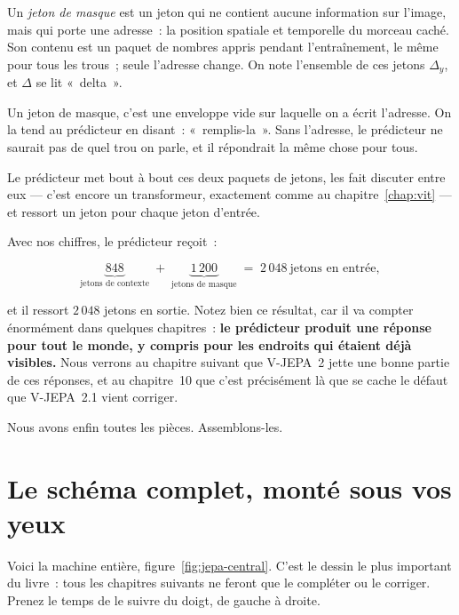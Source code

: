 \begin{definition}
Un \emph{jeton de masque} est un jeton qui ne contient aucune information
sur l'image, mais qui porte une adresse~: la position spatiale et temporelle
du morceau caché. Son contenu est un paquet de nombres appris pendant
l'entraînement, le même pour tous les trous~; seule l'adresse change. On
note l'ensemble de ces jetons $\Delta_y$, et $\Delta$ se lit «~delta~».
\end{definition}

\begin{intuition}
Un jeton de masque, c'est une enveloppe vide sur laquelle on a écrit
l'adresse. On la tend au prédicteur en disant~: «~remplis-la~». Sans
l'adresse, le prédicteur ne saurait pas de quel trou on parle, et il
répondrait la même chose pour tous.
\end{intuition}

Le prédicteur met bout à bout ces deux paquets de jetons, les fait discuter
entre eux — c'est encore un transformeur, exactement comme au
chapitre~\ref{chap:vit} — et ressort un jeton pour chaque jeton d'entrée.

\begin{exemple}
Avec nos chiffres, le prédicteur reçoit~:

\[
  \underbrace{848}_{\text{jetons de contexte}}
  \;+\;
  \underbrace{1\,200}_{\text{jetons de masque}}
  \;=\;
  2\,048 \ \text{jetons en entrée},
\]

et il ressort $2\,048$ jetons en sortie. Notez bien ce résultat, car il va
compter énormément dans quelques chapitres~: \textbf{le prédicteur produit
une réponse pour tout le monde, y compris pour les endroits qui étaient déjà
visibles.} Nous verrons au chapitre suivant que V-JEPA~2 jette une bonne
partie de ces réponses, et au chapitre~10 que c'est précisément là que se
cache le défaut que V-JEPA~2.1 vient corriger.
\end{exemple}

Nous avons enfin toutes les pièces. Assemblons-les.

\section{Le schéma complet, monté sous vos yeux}

Voici la machine entière, figure~\ref{fig:jepa-central}. C'est le dessin le
plus important du livre~: tous les chapitres suivants ne feront que le
compléter ou le corriger. Prenez le temps de le suivre du doigt, de gauche à
droite.

